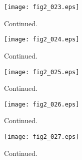 \documentclass[preprint]{aastex}
\begin{document}
\setcounter{figure}{1}
\begin{figure}[t]
\centering
\texttt{[image: fig2\_023.eps]}
\caption{
Continued. 
}
\label{Fig2}
\end{figure}
\clearpage



\setcounter{figure}{1}
\begin{figure}[t]
\centering
\texttt{[image: fig2\_024.eps]}
\caption{
Continued. 
}
\label{Fig2}
\end{figure}
\clearpage



\setcounter{figure}{1}
\begin{figure}[t]
\centering
\texttt{[image: fig2\_025.eps]}
\caption{
Continued. 
}
\label{Fig2}
\end{figure}
\clearpage



\setcounter{figure}{1}
\begin{figure}[t]
\centering
\texttt{[image: fig2\_026.eps]}
\caption{
Continued. 
}
\label{Fig2}
\end{figure}
\clearpage



\setcounter{figure}{1}
\begin{figure}[t]
\centering
\texttt{[image: fig2\_027.eps]}
\caption{
Continued. 
}
\label{Fig2}
\end{figure}
\clearpage
\end{document}
